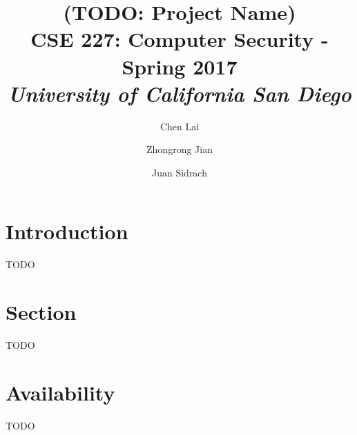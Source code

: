\documentclass[letterpaper,twocolumn,10pt]{article}
\begin{document}
\date{}

\title{\Large \textbf{
(TODO: Project Name) } \\ \vspace{0.025 in} \large \normalfont
CSE 227: Computer Security - Spring 2017 \\ \textit{
University of California San Diego
}}

\author{
{\rm Chen Lai}\\
\and
{\rm Zhongrong Jian}\\
\and
{\rm Juan Sidrach}\\
}

\maketitle


\section{Introduction}
TODO

\section{Section}
TODO

\section{Availability}
TODO~\cite{ipv4sta}

{\footnotesize 
}

\theendnotes
\end{document}
